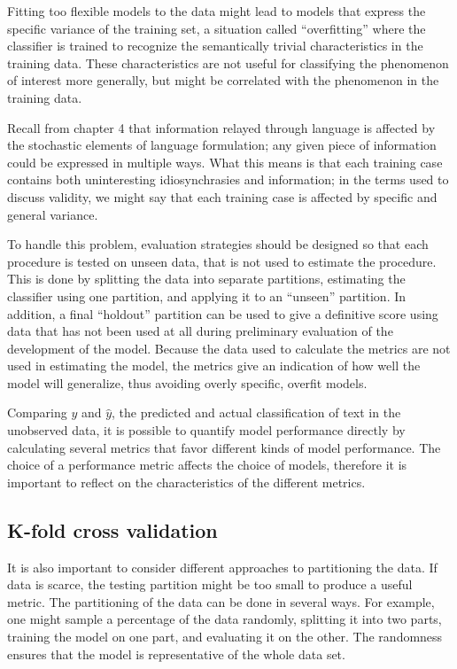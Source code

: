 \documentclass[12pt,twoside]{reedthesis}
\begin{document}
Fitting too flexible models to the data might lead to models that
express the specific variance of the training set, a situation called
``overfitting'' where the classifier is trained to recognize the
semantically trivial characteristics in the training data. These
characteristics are not useful for classifying the phenomenon of
interest more generally, but might be correlated with the phenomenon in
the training data.

Recall from chapter 4 that information relayed through language is
affected by the stochastic elements of language formulation; any given
piece of information could be expressed in multiple ways. What this
means is that each training case contains both uninteresting
idiosynchrasies and information; in the terms used to discuss validity,
we might say that each training case is affected by specific and general
variance.

To handle this problem, evaluation strategies should be designed so that
each procedure is tested on unseen data, that is not used to estimate
the procedure. This is done by splitting the data into separate
partitions, estimating the classifier using one partition, and applying
it to an ``unseen'' partition. In addition, a final ``holdout''
partition can be used to give a definitive score using data that has not
been used at all during preliminary evaluation of the development of the
model. Because the data used to calculate the metrics are not used in
estimating the model, the metrics give an indication of how well the
model will generalize, thus avoiding overly specific, overfit models.

Comparing \(y\) and \(\hat{y}\), the predicted and actual classification
of text in the unobserved data, it is possible to quantify model
performance directly by calculating several metrics that favor different
kinds of model performance. The choice of a performance metric affects
the choice of models, therefore it is important to reflect on the
characteristics of the different metrics.

\subsection{K-fold cross validation}\label{k-fold-cross-validation}

It is also important to consider different approaches to partitioning
the data. If data is scarce, the testing partition might be too small to
produce a useful metric. The partitioning of the data can be done in
several ways. For example, one might sample a percentage of the data
randomly, splitting it into two parts, training the model on one part,
and evaluating it on the other. The randomness ensures that the model is
representative of the whole data set.
\end{document}
